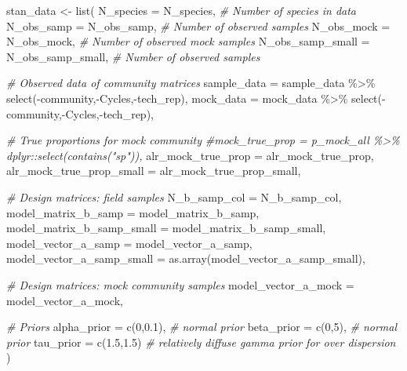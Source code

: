 \documentclass[
]{article}
\newenvironment{Shaded}{\begin{snugshade}}{\end{snugshade}}
\newcommand{\AttributeTok}[1]{\textcolor[rgb]{0.77,0.63,0.00}{#1}}
\newcommand{\CommentTok}[1]{\textcolor[rgb]{0.56,0.35,0.01}{\textit{#1}}}
\newcommand{\DecValTok}[1]{\textcolor[rgb]{0.00,0.00,0.81}{#1}}
\newcommand{\FloatTok}[1]{\textcolor[rgb]{0.00,0.00,0.81}{#1}}
\newcommand{\FunctionTok}[1]{\textcolor[rgb]{0.00,0.00,0.00}{#1}}
\newcommand{\NormalTok}[1]{#1}
\newcommand{\OtherTok}[1]{\textcolor[rgb]{0.56,0.35,0.01}{#1}}
\newcommand{\SpecialCharTok}[1]{\textcolor[rgb]{0.00,0.00,0.00}{#1}}
\begin{document}
\begin{Shaded}
\begin{Highlighting}[]
\NormalTok{stan\_data }\OtherTok{\textless{}{-}} \FunctionTok{list}\NormalTok{(}
  \AttributeTok{N\_species =}\NormalTok{ N\_species,   }\CommentTok{\# Number of species in data}
  \AttributeTok{N\_obs\_samp =}\NormalTok{ N\_obs\_samp, }\CommentTok{\# Number of observed samples }
  \AttributeTok{N\_obs\_mock =}\NormalTok{ N\_obs\_mock, }\CommentTok{\# Number of observed mock samples}
  \AttributeTok{N\_obs\_samp\_small =}\NormalTok{ N\_obs\_samp\_small, }\CommentTok{\# Number of observed samples }

  \CommentTok{\# Observed data of community matrices}
  \AttributeTok{sample\_data =}\NormalTok{ sample\_data }\SpecialCharTok{\%\textgreater{}\%} \FunctionTok{select}\NormalTok{(}\SpecialCharTok{{-}}\NormalTok{community,}\SpecialCharTok{{-}}\NormalTok{Cycles,}\SpecialCharTok{{-}}\NormalTok{tech\_rep),}
  \AttributeTok{mock\_data   =}\NormalTok{ mock\_data  }\SpecialCharTok{\%\textgreater{}\%} \FunctionTok{select}\NormalTok{(}\SpecialCharTok{{-}}\NormalTok{community,}\SpecialCharTok{{-}}\NormalTok{Cycles,}\SpecialCharTok{{-}}\NormalTok{tech\_rep),}
  
  \CommentTok{\# True proportions for mock community}
  \CommentTok{\#mock\_true\_prop = p\_mock\_all \%\textgreater{}\% dplyr::select(contains("sp")),}
  \AttributeTok{alr\_mock\_true\_prop =}\NormalTok{ alr\_mock\_true\_prop,}
  \AttributeTok{alr\_mock\_true\_prop\_small =}\NormalTok{ alr\_mock\_true\_prop\_small,}
  
  \CommentTok{\# Design matrices: field samples}
  \AttributeTok{N\_b\_samp\_col =}\NormalTok{ N\_b\_samp\_col,}
  \AttributeTok{model\_matrix\_b\_samp =}\NormalTok{ model\_matrix\_b\_samp,}
  \AttributeTok{model\_matrix\_b\_samp\_small =}\NormalTok{ model\_matrix\_b\_samp\_small,}
  \AttributeTok{model\_vector\_a\_samp =}\NormalTok{ model\_vector\_a\_samp,}
  \AttributeTok{model\_vector\_a\_samp\_small =} \FunctionTok{as.array}\NormalTok{(model\_vector\_a\_samp\_small),}
  
  \CommentTok{\# Design matrices: mock community samples}
  \AttributeTok{model\_vector\_a\_mock =}\NormalTok{ model\_vector\_a\_mock,}

  \CommentTok{\# Priors}
  \AttributeTok{alpha\_prior =} \FunctionTok{c}\NormalTok{(}\DecValTok{0}\NormalTok{,}\FloatTok{0.1}\NormalTok{),  }\CommentTok{\# normal prior}
  \AttributeTok{beta\_prior =} \FunctionTok{c}\NormalTok{(}\DecValTok{0}\NormalTok{,}\DecValTok{5}\NormalTok{),    }\CommentTok{\# normal prior}
  \AttributeTok{tau\_prior =} \FunctionTok{c}\NormalTok{(}\FloatTok{1.5}\NormalTok{,}\FloatTok{1.5}\NormalTok{)   }\CommentTok{\# relatively diffuse gamma prior for over dispersion}
\NormalTok{)}


\end{Highlighting}
\end{Shaded}
\end{document}
